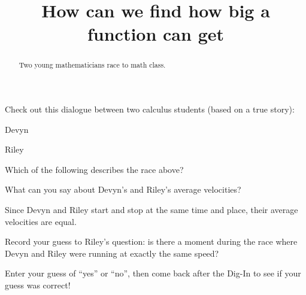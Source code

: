 \documentclass{ximera}
\title[Break-Ground:]{How can we find how big a function can get}
\begin{document}
\begin{abstract}
Two young mathematicians race to math class.
\end{abstract}
\maketitle

Check out this dialogue between two calculus students (based on a true
story):


\begin{dialogue}
\item[Devyn] 
\item[Riley] \end{dialogue}

\begin{problem}
  Which of the following describes the race above?
  \begin{multipleChoice}
  \end{multipleChoice}
\end{problem}

\begin{problem}
  What can you say about Devyn's and Riley's average velocities?
  \begin{multipleChoice}
  \begin{feedback}
    Since Devyn and Riley start and stop at the same time and place,
    their average velocities are equal.
  \end{feedback}
  \end{multipleChoice}
\end{problem}

\begin{problem}
  Record your guess to Riley's question: is there a moment during the race where Devyn and Riley were running at exactly the same speed?
  \begin{freeResponse}
  	Enter your guess of ``yes'' or ``no'', then come back after the Dig-In to see if your guess was correct!
  \end{freeResponse}
\end{problem}

%
\end{document}
